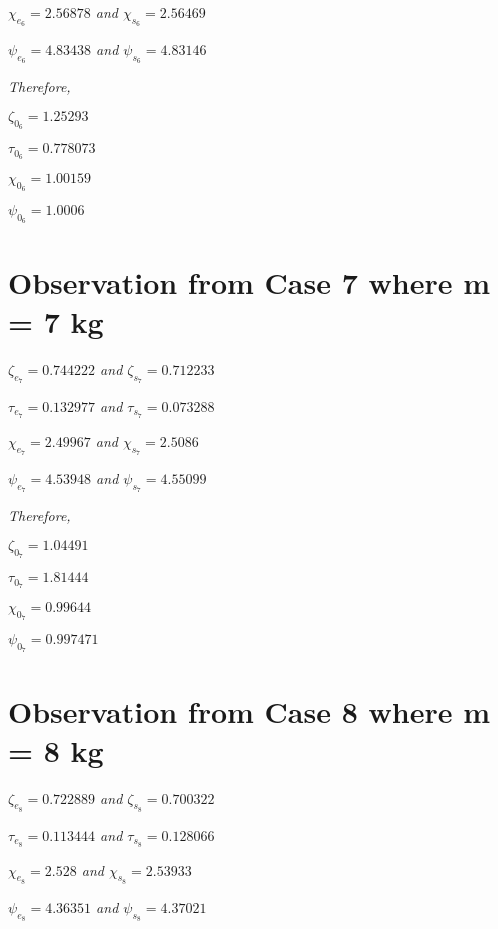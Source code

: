     \textit{$\chi_{e_6} = 2.56878$ and $\chi_{s_6} = 2.56469$}
            
    \textit{$\psi_{e_6} = 4.83438$ and $\psi_{s_6} = 4.83146$}
            
    \textit{Therefore,}
            
    $\zeta_{0_6} = 1.25293$
            
    $\tau_{0_6} = 0.778073$
            
    $\chi_{0_6} = 1.00159$
            
    $\psi_{0_6} = 1.0006$    
            
        
        
\section{{Observation from Case 7 where m = 7 kg}}
        
    \textit{$\zeta_{e_7} = 0.744222$ and $\zeta_{s_7} = 0.712233$}
            
    \textit{$\tau_{e_7} = 0.132977$ and $\tau_{s_7} = 0.073288$}
            
    \textit{$\chi_{e_7} = 2.49967$ and $\chi_{s_7} = 2.5086$}
            
    \textit{$\psi_{e_7} = 4.53948$ and $\psi_{s_7} = 4.55099$}
            
    \textit{Therefore,}
            
    $\zeta_{0_7} = 1.04491$
            
    $\tau_{0_7} = 1.81444$
            
    $\chi_{0_7} = 0.99644$
            
    $\psi_{0_7} = 0.997471$    
            
        
        
\section{{Observation from Case 8 where m = 8 kg}}
        
    \textit{$\zeta_{e_8} = 0.722889$ and $\zeta_{s_8} = 0.700322$}
            
    \textit{$\tau_{e_8} = 0.113444$ and $\tau_{s_8} = 0.128066$}
            
    \textit{$\chi_{e_8} = 2.528$ and $\chi_{s_8} = 2.53933$}
            
    \textit{$\psi_{e_8} = 4.36351$ and $\psi_{s_8} = 4.37021$}
            
